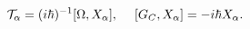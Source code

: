 \begin{equation}
{\cal T}_{\alpha}=(i\hbar)^{-1}[\Omega,X_{\alpha}],\quad\;[G_{C},X_{\alpha
}]=-i\hbar X_{\alpha}.\label{3.2}%
\end{equation}

